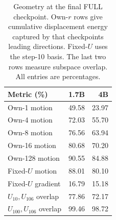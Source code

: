 \begin{table}[t]
\centering
\caption{Geometry at the final FULL checkpoint. Own-$r$ rows give cumulative displacement energy captured by that checkpoint\textquotesingle s leading directions. Fixed-$U$ uses the step-10 basis. The last two rows measure subspace overlap. All entries are percentages.}
\label{tab:subspace}
\small
\setlength{\tabcolsep}{3pt}
\begin{tabular}{lrr}
\toprule
Metric (\%) & 1.7B & 4B \\
\midrule
Own-1 motion & 49.58 & 23.97 \\
Own-4 motion & 72.03 & 55.70 \\
Own-8 motion & 76.56 & 63.94 \\
Own-16 motion & 80.68 & 70.20 \\
Own-128 motion & 90.55 & 84.88 \\
Fixed-$U$ motion & 88.01 & 80.10 \\
Fixed-$U$ gradient & 16.79 & 15.18 \\
$U_{10},U_{106}$ overlap & 77.86 & 72.17 \\
$U_{100},U_{106}$ overlap & 99.46 & 98.72 \\
\bottomrule
\end{tabular}
\end{table}
